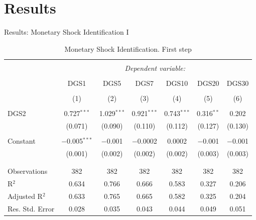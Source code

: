 \documentclass[11pt,pdf,aspectratio=129]{beamer}
\begin{document}
    




\section{Results}

\begin{frame}{Results: Monetary Shock Identification I}
    \begin{table}[ht] \centering \tiny
        \begin{threeparttable}
        \caption{Monetary Shock Identification.  First step} 
        \label{tab:Betas} 
      \begin{tabular}{@{\extracolsep{1pt}}lcccccc} 
        \\[-1.8ex]\hline 
        \hline \\[-1.8ex] 
         & \multicolumn{6}{c}{\textit{Dependent variable:}} \\ 
        \cline{2-7} 
        \\[-1.8ex] & DGS1 & DGS5 & DGS7 & DGS10 & DGS20 & DGS30 \\ 
        \\[-1.8ex] & (1) & (2) & (3) & (4) & (5) & (6)\\ 
        \hline \\[-1.8ex] 
         DGS2 & 0.727$^{***}$ & 1.029$^{***}$ & 0.921$^{***}$ & 0.743$^{***}$ & 0.316$^{**}$ & 0.202 \\ 
          & (0.071) & (0.090) & (0.110) & (0.112) & (0.127) & (0.130) \\ 
          & & & & & & \\ 
         Constant & $-$0.005$^{***}$ & $-$0.001 & $-$0.0002 & 0.0002 & $-$0.001 & $-$0.001 \\ 
          & (0.001) & (0.002) & (0.002) & (0.002) & (0.003) & (0.003) \\ 
          & & & & & & \\ 
        \hline \\[-1.8ex] 
        Observations & 382 & 382 & 382 & 382 & 382 & 382 \\ 
        R$^{2}$ & 0.634 & 0.766 & 0.666 & 0.583 & 0.327 & 0.206 \\ 
        Adjusted R$^{2}$ & 0.633 & 0.765 & 0.665 & 0.582 & 0.325 & 0.204 \\ 
        Res. Std. Error & 0.028 & 0.035 & 0.043 & 0.044 & 0.049 & 0.051 \\ 

\end{tabular}
\end{threeparttable}
\end{table}
\end{frame}
\end{document}
